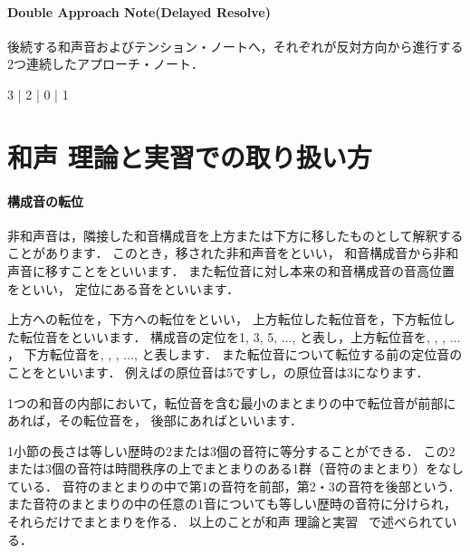 \documentclass[dvipdfmx,uplatex,b5paper,openany,jbase=12Q,nomag*,textwidth-limit=44%
               ]{gachimuchi}
\begin{document}
\paragraph{Double Approach Note(Delayed Resolve)}
後続する和声音およびテンション・ノートへ，それぞれが反対方向から進行する2つ連続したアプローチ・ノート．
\begin{floatMusic}[width=0.9\linewidth]
  \nostartrule%
  \Startpiece%
  \Notes
  3%
  \zcharsu{*}%
  \zcharsu{*}%
  \en\bar\NOTes%
  \en\doublebar
  \Notes
  \ds
  2%
  \zcharsu{*}%
  \zcharsu{*}%
  \en\bar\NOTes%
  \en\doublebar
  \Notes
  0%
  \zcharsu{*}%
  \zcharsu{*}%
  \en\bar\Notes%
  1\zcharsu{*}%
  \zcharsu{*}%
  \en\NOtes
  \en\setdoublebar
  \endpiece%
\end{floatMusic}

\section{和声 理論と実習での取り扱い方}
\paragraph{構成音の転位}
非和声音は，隣接した和音構成音を上方または下方に移したものとして解釈することがあります．
このとき，移された非和声音をといい，
和音構成音から非和声音に移すことをといいます\cite[p.111]{chSHIMAOKA1iii}．
また転位音に対し本来の和音構成音の音高位置をといい，
定位にある音をといいます．

上方への転位を，下方への転位をといい，
上方転位した転位音を，下方転位した転位音をといいます．
構成音の定位を1, 3, 5, $\ldots$, と表し，上方転位音を, , , $\ldots$，
下方転位音を, , , $\ldots$, と表します．
また転位音について転位する前の定位音のことをといいます．
例えばの原位音は5ですし，の原位音は3になります．

1つの和音の内部において，転位音を含む最小のまとまりの中で転位音が前部にあれば，その転位音を，
後部にあればといいます．

\begin{chuui}
1小節の長さは等しい歴時の2または3個の音符に等分することができる．
この2または3個の音符は時間秩序の上でまとまりのある1群（音符のまとまり）をなしている．
音符のまとまりの中で第1の音符を前部，第2・3の音符を後部という．
また音符のまとまりの中の任意の1音についても等しい歴時の音符に分けられ，それらだけでまとまりを作る．
以上のことが和声 理論と実習 \Gniii~\cite{chSHIMAOKA1iii}で述べられている．
\end{chuui}
\end{document}
